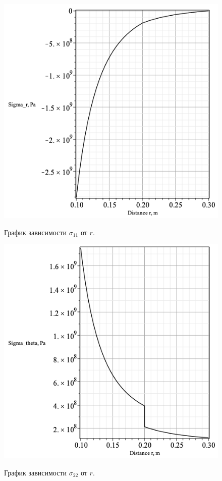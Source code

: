 \documentclass[a4paper,12pt]{article}	%
\begin{document}
\begin{figure}[H]
    \centering
    \includegraphics[scale=0.6]{img/Graph1_Lab1.png}\\
    \caption{График зависимости $\sigma_{11}$ от $r$.}
    \label{fig_7}
\end{figure}

    
\begin{figure}[H]
    \centering
    \includegraphics[scale=0.6]{img/Graph3_Lab1.png}\\
    \caption{График зависимости $\sigma_{22}$ от $r$.}
    \label{fig_8}
\end{figure}
\end{document}
